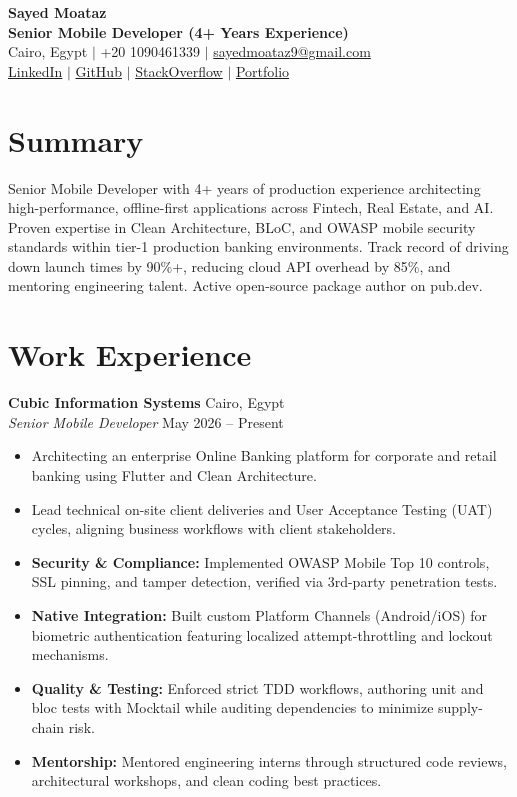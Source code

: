 \documentclass[letterpaper,10pt]{article}
\begin{document}
\begin{center}
    {\LARGE \textbf{Sayed Moataz}}\\[2pt]
    \textbf{Senior Mobile Developer (4+ Years Experience)}\\[2pt]
    Cairo, Egypt $\vert$ +20 1090461339 $\vert$ \href{mailto:sayedmoataz9@gmail.com}{sayedmoataz9@gmail.com}\\
    \href{https://www.linkedin.com/in/saayeedmdawoud}{LinkedIn} $\vert$ 
    \href{https://github.com/sayedmoataz}{GitHub} $\vert$
    \href{https://stackoverflow.com/users/11287483/saayeed-m-daawoud}{StackOverflow} $\vert$
    \href{https://sayed-moataz-portfolio-five.vercel.app}{Portfolio}
\end{center}

\section{Summary}
Senior Mobile Developer with 4+ years of production experience architecting high-performance, offline-first applications across Fintech, Real Estate, and AI. Proven expertise in Clean Architecture, BLoC, and OWASP mobile security standards within tier-1 production banking environments. Track record of driving down launch times by 90\%+, reducing cloud API overhead by 85\%, and mentoring engineering talent. Active open-source package author on pub.dev.

\section{Work Experience}

\textbf{Cubic Information Systems} \hfill Cairo, Egypt\\
\textit{Senior Mobile Developer} \hfill May 2026 -- Present
\begin{itemize}
    \item Architecting an enterprise Online Banking platform for corporate and retail banking using Flutter and Clean Architecture.
    \item Lead technical on-site client deliveries and User Acceptance Testing (UAT) cycles, aligning business workflows with client stakeholders.
    \item \textbf{Security \& Compliance:} Implemented OWASP Mobile Top 10 controls, SSL pinning, and tamper detection, verified via 3rd-party penetration tests.
    \item \textbf{Native Integration:} Built custom Platform Channels (Android/iOS) for biometric authentication featuring localized attempt-throttling and lockout mechanisms.
    \item \textbf{Quality \& Testing:} Enforced strict TDD workflows, authoring unit and bloc tests with Mocktail while auditing dependencies to minimize supply-chain risk.
    \item \textbf{Mentorship:} Mentored engineering interns through structured code reviews, architectural workshops, and clean coding best practices.
\end{itemize}
\end{document}
